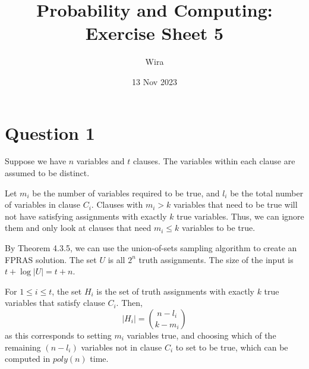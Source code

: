 \documentclass[11pt]{article} %
\title{Probability and Computing: \\Exercise Sheet 5}
\author{Wira}
\date{13 Nov 2023}
\begin{document}
%
\maketitle




\section*{Question 1}

Suppose we have $n$ variables and $t$ clauses. 
The variables within each clause are assumed to be distinct.

Let $m_i$ be the number of variables required to be true, 
and $l_i$ be the total number of variables in clause $C_i$.
Clauses with $m_i > k$ variables that need to be true 
will not have satisfying assignments with exactly $k$ true variables.
Thus, we can ignore them and only look at clauses that need $m_i \leq k$ variables to be true.

By Theorem 4.3.5, we can use the union-of-sets sampling algorithm to create an FPRAS solution.
The set $U$ is all $2^n$ truth assignments. 
The size of the input is $t + \log |U| = t + n$.

For $1 \leq i \leq t$, the set $H_i$ is the set of truth assignments 
with exactly $k$ true variables that satisfy clause $C_i$.
Then,
\[|H_i| = \binom{n-l_i}{k-m_i}\]
as this corresponds to setting $m_i$ variables true, 
and choosing which of the remaining $(n-l_i)$ variables not in clause $C_i$ to set to be true,
which can be computed in $poly(n)$ time.
\end{document}
